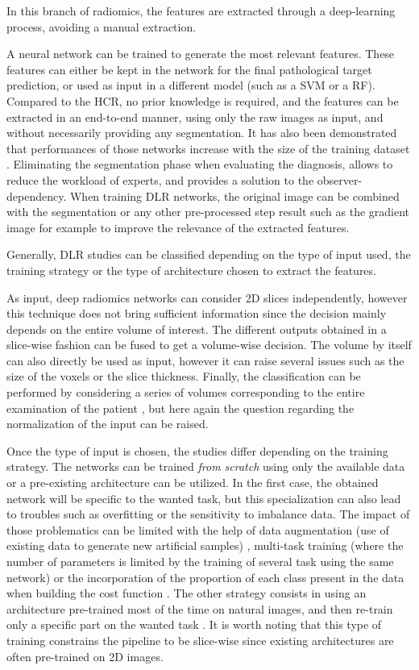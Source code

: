\documentclass[]{article}
\begin{document}
In this branch of radiomics, the features are extracted through a
deep-learning process, avoiding a manual extraction.

A neural network can be trained to generate the most relevant features.
These features can either be kept in the network for the final
pathological target prediction, or used as input in a different model
(such as a SVM or a RF).
Compared to the HCR, no prior knowledge is required, and the
features can be extracted in an end-to-end manner, using only the raw
images as input, and without necessarily providing any segmentation. It
has also been demonstrated that performances of those networks increase
with the size of the training dataset \cite{Cheng2016}.
Eliminating the segmentation phase when evaluating the diagnosis, allows
to reduce the workload of experts, and provides a solution to the
observer-dependency.
When training DLR networks, the original image can be combined
with the segmentation or any other pre-processed step result such as the
gradient image for example \cite{Sun2017a} to improve
the relevance of the extracted features.

Generally, DLR studies can be classified depending on the type of
input used, the training strategy or the type of architecture chosen to
extract the features.

As input, deep radiomics networks can consider 2D slices independently,
however this technique does not bring sufficient information since the
decision mainly depends on the entire volume of interest.
The different outputs obtained in a slice-wise fashion can be fused to
get a volume-wise decision. The volume by itself can also directly be
used as input, however it can raise several issues such as the size of
the voxels or the slice thickness. Finally, the classification can be
performed by considering a series of volumes corresponding to the entire
examination of the patient \cite{Shen2016}, but here
again the question regarding the normalization of the input can be
raised.

Once the type of input is chosen, the studies differ depending on the
training strategy. The networks can be trained \emph{from scratch} using
only the available data or a pre-existing architecture can be utilized.
In the first case, the obtained network will be specific to the wanted
task, but this specialization can also lead to troubles such as
overfitting or the sensitivity to imbalance data.
The impact of those problematics can be limited with the help of data
augmentation (use of existing data to generate new artificial samples) \cite{Kumar2017}, multi-task training (where the
number of parameters is limited by the training of several task using
the same network) or the
incorporation of the proportion of each class present in the data when
building the cost function \cite{Jamaludin2016}.
The other strategy consists in using an architecture pre-trained most of
the time on natural images, and then re-train only a specific part on
the wanted task \cite{Echaniz2017,Huynh2016,Paul2016}. It
is worth noting that this type of training constrains the pipeline to be
slice-wise since existing architectures are often pre-trained on 2D
images.\\
\end{document}
